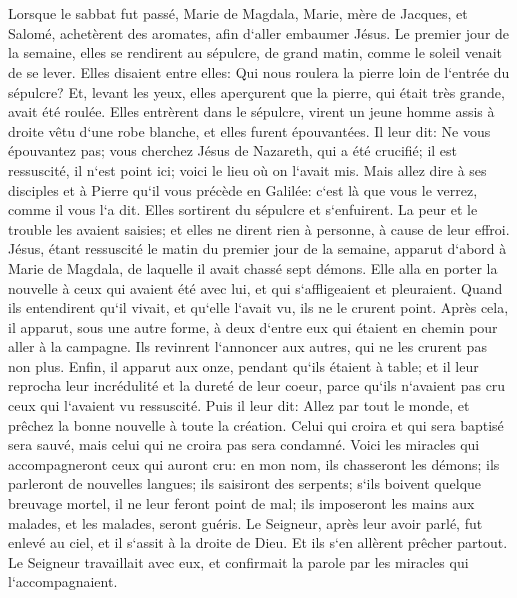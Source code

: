 \chapter{}

\verse Lorsque le sabbat fut passé, Marie de Magdala, Marie, mère de Jacques, et Salomé, achetèrent des aromates, afin d`aller embaumer Jésus. 
\verse Le premier jour de la semaine, elles se rendirent au sépulcre, de grand matin, comme le soleil venait de se lever. 
\verse Elles disaient entre elles: Qui nous roulera la pierre loin de l`entrée du sépulcre? 
\verse Et, levant les yeux, elles aperçurent que la pierre, qui était très grande, avait été roulée. 
\verse Elles entrèrent dans le sépulcre, virent un jeune homme assis à droite vêtu d`une robe blanche, et elles furent épouvantées. 
\verse Il leur dit: Ne vous épouvantez pas; vous cherchez Jésus de Nazareth, qui a été crucifié; il est ressuscité, il n`est point ici; voici le lieu où on l`avait mis. 
\verse Mais allez dire à ses disciples et à Pierre qu`il vous précède en Galilée: c`est là que vous le verrez, comme il vous l`a dit. 
\verse Elles sortirent du sépulcre et s`enfuirent. La peur et le trouble les avaient saisies; et elles ne dirent rien à personne, à cause de leur effroi. 
\verse Jésus, étant ressuscité le matin du premier jour de la semaine, apparut d`abord à Marie de Magdala, de laquelle il avait chassé sept démons. 
\verse Elle alla en porter la nouvelle à ceux qui avaient été avec lui, et qui s`affligeaient et pleuraient. 
\verse Quand ils entendirent qu`il vivait, et qu`elle l`avait vu, ils ne le crurent point. 
\verse Après cela, il apparut, sous une autre forme, à deux d`entre eux qui étaient en chemin pour aller à la campagne. 
\verse Ils revinrent l`annoncer aux autres, qui ne les crurent pas non plus. 
\verse Enfin, il apparut aux onze, pendant qu`ils étaient à table; et il leur reprocha leur incrédulité et la dureté de leur coeur, parce qu`ils n`avaient pas cru ceux qui l`avaient vu ressuscité. 
\verse Puis il leur dit: Allez par tout le monde, et prêchez la bonne nouvelle à toute la création. 
\verse Celui qui croira et qui sera baptisé sera sauvé, mais celui qui ne croira pas sera condamné. 
\verse Voici les miracles qui accompagneront ceux qui auront cru: en mon nom, ils chasseront les démons; ils parleront de nouvelles langues; 
\verse ils saisiront des serpents; s`ils boivent quelque breuvage mortel, il ne leur feront point de mal; ils imposeront les mains aux malades, et les malades, seront guéris. 
\verse Le Seigneur, après leur avoir parlé, fut enlevé au ciel, et il s`assit à la droite de Dieu. 
\verse Et ils s`en allèrent prêcher partout. Le Seigneur travaillait avec eux, et confirmait la parole par les miracles qui l`accompagnaient. 
